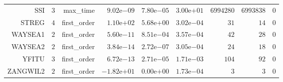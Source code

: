 \begin{longtable}{rrrrrrrrr}
SSI & \(     3\) & max\_time & \( 9.02\)e\(-09\) & \( 7.80\)e\(-05\) & \( 3.00\)e\(+01\) & \(6994280\) & \(6993838\) & \(     0\) \\
STREG & \(     4\) & first\_order & \( 1.10\)e\(+02\) & \( 5.68\)e\(+00\) & \( 3.02\)e\(-04\) & \(    31\) & \(    14\) & \(     0\) \\
WAYSEA1 & \(     2\) & first\_order & \( 5.60\)e\(-11\) & \( 8.51\)e\(-04\) & \( 3.57\)e\(-04\) & \(    42\) & \(    28\) & \(     0\) \\
WAYSEA2 & \(     2\) & first\_order & \( 3.84\)e\(-14\) & \( 2.72\)e\(-07\) & \( 3.05\)e\(-04\) & \(    24\) & \(    18\) & \(     0\) \\
YFITU & \(     3\) & first\_order & \( 6.72\)e\(-13\) & \( 2.71\)e\(-05\) & \( 1.71\)e\(-03\) & \(   104\) & \(    92\) & \(     0\) \\
ZANGWIL2 & \(     2\) & first\_order & \(-1.82\)e\(+01\) & \( 0.00\)e\(+00\) & \( 1.73\)e\(-04\) & \(     3\) & \(     3\) & \(     0\) \\\hline
\end{longtable}
